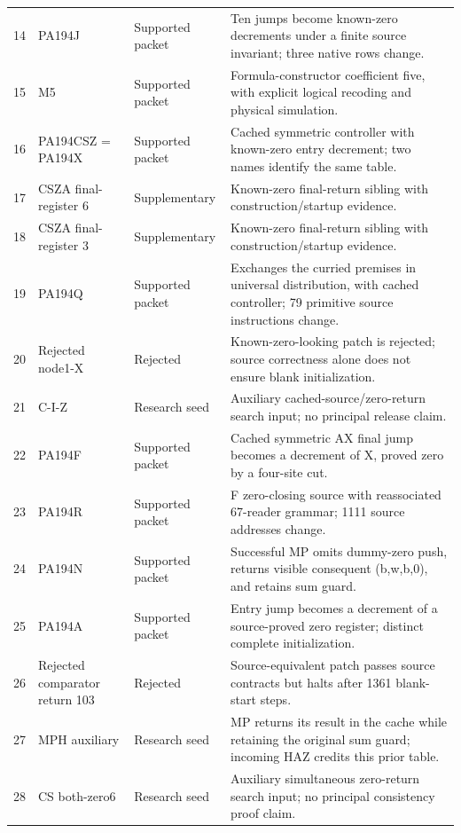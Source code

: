{\begin{longtable}{@{}r >{\raggedright\arraybackslash}p{.21\linewidth}
 >{\raggedright\arraybackslash}p{.14\linewidth}
 >{\raggedright\arraybackslash}p{.54\linewidth}@{}}
14 & PA194J & Supported packet & Ten jumps become known-zero decrements under a finite source invariant; three native rows change.\\[4pt]
15 & M5 & Supported packet & Formula-constructor coefficient five, with explicit logical recoding and physical simulation.\\[4pt]
16 & PA194CSZ = PA194X & Supported packet & Cached symmetric controller with known-zero entry decrement; two names identify the same table.\\[4pt]
17 & CSZA final-register 6 & Supplementary & Known-zero final-return sibling with construction/startup evidence.\\[4pt]
18 & CSZA final-register 3 & Supplementary & Known-zero final-return sibling with construction/startup evidence.\\[4pt]
19 & PA194Q & Supported packet & Exchanges the curried premises in universal distribution, with cached controller; 79 primitive source instructions change.\\[4pt]
20 & Rejected node1-X & Rejected & Known-zero-looking patch is rejected; source correctness alone does not ensure blank initialization.\\[4pt]
21 & C-I-Z & Research seed & Auxiliary cached-source/zero-return search input; no principal release claim.\\[4pt]
22 & PA194F & Supported packet & Cached symmetric AX final jump becomes a decrement of X, proved zero by a four-site cut.\\[4pt]
23 & PA194R & Supported packet & F zero-closing source with reassociated 67-reader grammar; 1111 source addresses change.\\[4pt]
24 & PA194N & Supported packet & Successful MP omits dummy-zero push, returns visible consequent (b,w,b,0), and retains sum guard.\\[4pt]
25 & PA194A & Supported packet & Entry jump becomes a decrement of a source-proved zero register; distinct complete initialization.\\[4pt]
26 & Rejected comparator return 103 & Rejected & Source-equivalent patch passes source contracts but halts after 1361 blank-start steps.\\[4pt]
27 & MPH auxiliary & Research seed & MP returns its result in the cache while retaining the original sum guard; incoming HAZ credits this prior table.\\[4pt]
28 & CS both-zero6 & Research seed & Auxiliary simultaneous zero-return search input; no principal consistency proof claim.\\[4pt]

\end{longtable}}
